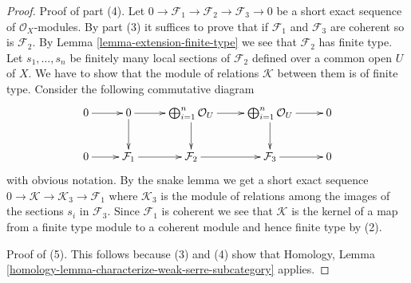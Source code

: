 \documentclass[10pt,a4paper]{amsart}
\theoremstyle{plain}
\theoremstyle{definition}
\theoremstyle{remark}
\numberwithin{equation}{subsection}
\begin{document}
\begin{proof}
\medskip\noindent
Proof of part (4).
Let $0 \to \mathcal{F}_1 \to \mathcal{F}_2 \to \mathcal{F}_3 \to 0$
be a short exact sequence of $\mathcal{O}_X$-modules. By part
(3) it suffices
to prove that if $\mathcal{F}_1$ and $\mathcal{F}_3$ are coherent
so is $\mathcal{F}_2$. By Lemma \ref{lemma-extension-finite-type} we
see that $\mathcal{F}_2$ has finite type. Let
$s_1, \ldots, s_n$ be finitely many local
sections of $\mathcal{F}_2$ defined over a common open $U$ of $X$.
We have to show that the module of relations $\mathcal{K}$
between them is of finite type.
Consider the following commutative diagram
$$
\xymatrix{
0 \ar[r] &
0 \ar[r] \ar[d] &
\bigoplus_{i = 1}^{n} \mathcal{O}_U \ar[r] \ar[d] &
\bigoplus_{i = 1}^{n} \mathcal{O}_U \ar[r] \ar[d] &
0 \\
0 \ar[r] &
\mathcal{F}_1 \ar[r] &
\mathcal{F}_2 \ar[r] &
\mathcal{F}_3 \ar[r] &
0
}
$$
with obvious notation. By the snake lemma
we get a short exact sequence
$0 \to \mathcal{K} \to \mathcal{K}_3 \to \mathcal{F}_1$
where $\mathcal{K}_3$ is the module of relations among
the images of the sections $s_i$ in $\mathcal{F}_3$.
Since $\mathcal{F}_1$ is coherent we see that
$\mathcal{K}$ is the kernel of a map from a finite type module
to a coherent module and hence finite type by (2).

\medskip\noindent
Proof of (5). This follows because (3) and (4) show that
Homology, Lemma \ref{homology-lemma-characterize-weak-serre-subcategory}
applies.
\end{proof}
\end{document}
